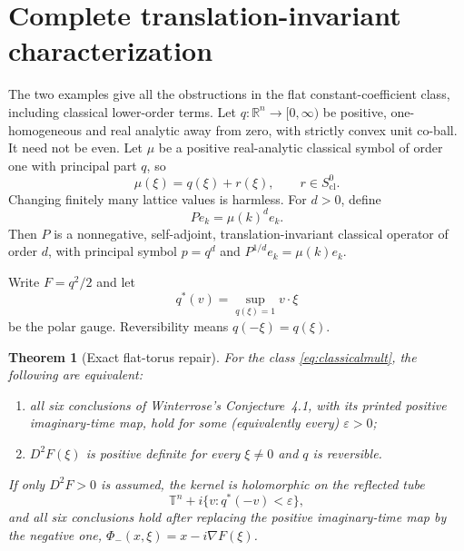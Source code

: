 \documentclass[11pt]{article}
\newtheorem{theorem}{Theorem}
\theoremstyle{remark}
\newcommand{\T}{\mathbb T}
\newcommand{\R}{\mathbb R}
\newcommand{\eps}{\varepsilon}
\begin{document}
\section{Complete translation-invariant characterization}
\label{sec:characterization}

The two examples give all the obstructions in the flat constant-coefficient
class, including classical lower-order terms.  Let
$q:\R^n\to[0,\infty)$ be positive, one-homogeneous and real analytic away
from zero, with strictly convex unit co-ball.  It need not be even.  Let
$\mu$ be a positive real-analytic classical symbol of order one with principal
part $q$, so
\begin{equation}\label{eq:muclassical}
 \mu(\xi)=q(\xi)+r(\xi),\qquad r\in S^0_{\mathrm{cl}}.
\end{equation}
Changing finitely many lattice values is harmless.  For $d>0$, define
\begin{equation}\label{eq:classicalmult}
 Pe_k=\mu(k)^d e_k.
\end{equation}
Then $P$ is a nonnegative, self-adjoint, translation-invariant classical
operator of order $d$, with principal symbol $p=q^d$ and
$P^{1/d}e_k=\mu(k)e_k$.

Write $F=q^2/2$ and let
\[
 q^*(v)=\sup_{q(\xi)=1}v\cdot\xi
\]
be the polar gauge.  Reversibility means $q(-\xi)=q(\xi)$.

\begin{theorem}[Exact flat-torus repair]
\label{thm:characterization}
For the class \eqref{eq:classicalmult}, the following are equivalent:
\begin{enumerate}[label=\textnormal{(\roman*)}]
\item all six conclusions of Winterrose's Conjecture~4.1, with its printed
      positive imaginary-time map, hold for some (equivalently every)
      $\eps>0$;
\item $D^2F(\xi)$ is positive definite for every $\xi\neq0$ and $q$ is
      reversible.
\end{enumerate}
If only $D^2F>0$ is assumed, the kernel is holomorphic on the reflected tube
\[
 \T^n+i\{v:q^*(-v)<\eps\},
\]
and all six conclusions hold after replacing the positive imaginary-time map
by the negative one, $\Phi_-(x,\xi)=x-i\nabla F(\xi)$.
\end{theorem}
\end{document}
